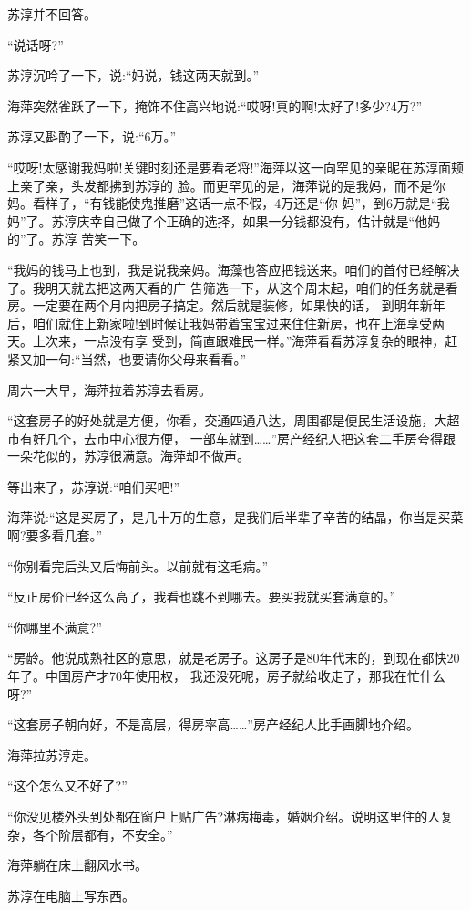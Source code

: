 \documentclass[11pt,a4paper,onecolumn]{article}
\begin{document}
苏淳并不回答。

``说话呀?''

苏淳沉吟了一下，说:``妈说，钱这两天就到。''

海萍突然雀跃了一下，掩饰不住高兴地说:``哎呀!真的啊!太好了!多少?4万?''

苏淳又斟酌了一下，说:``6万。''

``哎呀!太感谢我妈啦!关键时刻还是要看老将!''海萍以这一向罕见的亲昵在苏淳面颊上亲了亲，头发都拂到苏淳的
脸。而更罕见的是，海萍说的是我妈，而不是你妈。看样子，``有钱能使鬼推磨''这话一点不假，4万还是``你
妈''，到6万就是``我妈''了。苏淳庆幸自己做了个正确的选择，如果一分钱都没有，估计就是``他妈的''了。苏淳
苦笑一下。

``我妈的钱马上也到，我是说我亲妈。海藻也答应把钱送来。咱们的首付已经解决了。我明天就去把这两天看的广
告筛选一下，从这个周末起，咱们的任务就是看房。一定要在两个月内把房子搞定。然后就是装修，如果快的话，
到明年新年后，咱们就住上新家啦!到时候让我妈带着宝宝过来住住新房，也在上海享受两天。上次来，一点没有享
受到，简直跟难民一样。''海萍看看苏淳复杂的眼神，赶紧又加一句:``当然，也要请你父母来看看。''

周六一大早，海萍拉着苏淳去看房。

``这套房子的好处就是方便，你看，交通四通八达，周围都是便民生活设施，大超市有好几个，去市中心很方便，
一部车就到……''房产经纪人把这套二手房夸得跟一朵花似的，苏淳很满意。海萍却不做声。

等出来了，苏淳说:``咱们买吧!''

海萍说:``这是买房子，是几十万的生意，是我们后半辈子辛苦的结晶，你当是买菜啊?要多看几套。''

``你别看完后头又后悔前头。以前就有这毛病。''

``反正房价已经这么高了，我看也跳不到哪去。要买我就买套满意的。''

``你哪里不满意?''

``房龄。他说成熟社区的意思，就是老房子。这房子是80年代末的，到现在都快20年了。中国房产才70年使用权，
我还没死呢，房子就给收走了，那我在忙什么呀?''

``这套房子朝向好，不是高层，得房率高……''房产经纪人比手画脚地介绍。

海萍拉苏淳走。

``这个怎么又不好了?''

``你没见楼外头到处都在窗户上贴广告?淋病梅毒，婚姻介绍。说明这里住的人复杂，各个阶层都有，不安全。''

海萍躺在床上翻风水书。

苏淳在电脑上写东西。
\end{document}
